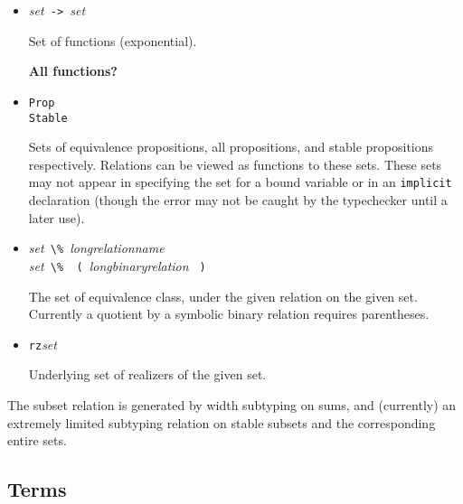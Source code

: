 \documentclass[11pt]{article}
\newcommand{\keywd}[1]{\mbox{\texttt{#1}}\xspace}
\newcommand{\EQUIVPROP}{\keywd{Equiv}}
\newcommand{\IMPLICIT}{\keywd{implicit}}
\newcommand{\PROP}{\keywd{Prop}}
\newcommand{\RZ}{\keywd{rz}}
\newcommand{\STABLEPROP}{\keywd{Stable}}
\newcommand{\metav}[1]{\mbox{\textit{#1}}\xspace}
\newcommand{\Setexp}{\metav{set}}
\newcommand{\ARROW}{\mbox{\Verb| -> |}}
\newcommand{\LPAREN}{\mbox{\Verb| ( |}}
\newcommand{\PERCENT}{\mbox{\Verb+ \% +}}
\newcommand{\RPAREN}{\mbox{\Verb| ) |}}
\begin{document}
\begin{itemize}
\item \Setexp \ARROW \Setexp

  Set of functions (exponential).

  \textbf{All functions?}

\item %
      \PROP\\
      \STABLEPROP

  Sets of equivalence propositions, all propositions, and stable
  propositions respectively.  Relations can be viewed as functions
  to these sets.  These sets may not appear in specifying the set
  for a bound variable or in an \IMPLICIT declaration (though
  the error may not be caught by the typechecker until a later use).

\iffalse
\EQUIVPROP is used internally by the typechecker,
  but there's currently no way to specify this set in the source.
  Is this a bug?

No --- it's not a set in the topos, so we don't 
\fi

\item \Setexp \PERCENT \metav{longrelationname}\\
      \Setexp \PERCENT \LPAREN \metav{longbinaryrelation} \RPAREN

  The set of equivalence class, under the given relation on the
  given set. Currently a quotient by a symbolic binary relation requires
  parentheses.

\item \RZ \Setexp

  Underlying set of realizers of the given set.
\end{itemize}


The subset relation is generated by width subtyping on sums, and
(currently) an extremely limited subtyping relation on
stable subsets and the corresponding entire sets.


\subsection{Terms}
\end{document}
